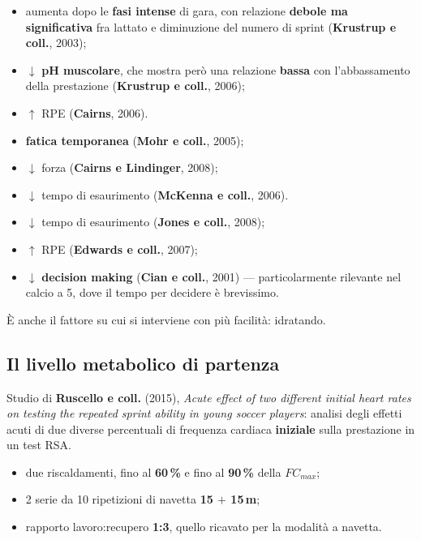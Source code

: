 \begin{itemize}
  \item aumenta dopo le \textbf{fasi intense} di gara, con relazione \textbf{debole ma
    significativa} fra lattato e diminuzione del numero di sprint (\textbf{Krustrup e coll.},
    2003);
  \item $\downarrow$ \textbf{pH muscolare}, che mostra però una relazione \textbf{bassa} con
    l'abbassamento della prestazione (\textbf{Krustrup e coll.}, 2006);
  \item $\uparrow$ RPE (\textbf{Cairns}, 2006).
\end{itemize}

\begin{itemize}
  \item \textbf{fatica temporanea} (\textbf{Mohr e coll.}, 2005);
  \item $\downarrow$ forza (\textbf{Cairns e Lindinger}, 2008);
  \item $\downarrow$ tempo di esaurimento (\textbf{McKenna e coll.}, 2006).
\end{itemize}

\begin{itemize}
  \item $\downarrow$ tempo di esaurimento (\textbf{Jones e coll.}, 2008);
  \item $\uparrow$ RPE (\textbf{Edwards e coll.}, 2007);
  \item $\downarrow$ \textbf{decision making} (\textbf{Cian e coll.}, 2001) --- particolarmente
    rilevante nel calcio a 5, dove il tempo per decidere è brevissimo.
\end{itemize}
È anche il fattore su cui si interviene con più facilità: idratando.

\subsection{Il livello metabolico di partenza}

Studio di \textbf{Ruscello e coll.} (2015), \textit{Acute effect of two different initial heart
rates on testing the repeated sprint ability in young soccer players}: analisi degli effetti acuti
di due diverse percentuali di frequenza cardiaca \textbf{iniziale} sulla prestazione in un test
RSA.

\begin{itemize}
  \item due riscaldamenti, fino al \textbf{60\,\%} e fino al \textbf{90\,\%} della $FC_{max}$;
  \item 2 serie da 10 ripetizioni di navetta \textbf{15 $+$ 15\,m};
  \item rapporto lavoro:recupero \textbf{1:3}, quello ricavato per la modalità a navetta.
\end{itemize}

